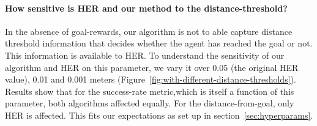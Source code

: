 \paragraph{How sensitive is HER and our method to the distance-threshold?}
In the absence of goal-rewards, our algorithm is not to able capture distance
threshold information that decides whether the agent has reached the goal or
not. This information is available to HER. To understand the
sensitivity of our algorithm and HER on this parameter, we vary it over
0.05 (the original HER value), 0.01 and 0.001 meters
(Figure~\ref{fig:with-different-distance-thresholds}). Results show that
for the success-rate metric,which is itself a function of this
parameter, both algorithms affected equally. For the distance-from-goal,
only HER is affected. This fits our expectations as set up in 
section~\ref{sec:hyperparams}.




